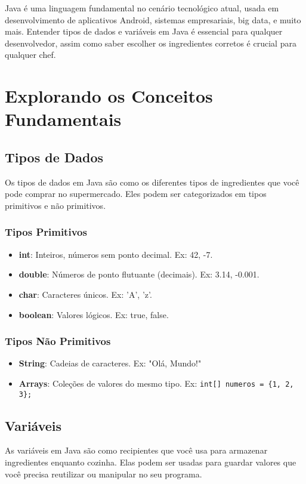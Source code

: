 \documentclass[a4paper,12pt]{book}
\begin{document}
Java é uma linguagem fundamental no cenário tecnológico atual, usada em desenvolvimento de aplicativos Android, sistemas empresariais, big data, e muito mais. Entender tipos de dados e variáveis em Java é essencial para qualquer desenvolvedor, assim como saber escolher os ingredientes corretos é crucial para qualquer chef.

\section{Explorando os Conceitos Fundamentais}

\subsection{Tipos de Dados}
Os tipos de dados em Java são como os diferentes tipos de ingredientes que você pode comprar no supermercado. Eles podem ser categorizados em tipos primitivos e não primitivos.

\subsubsection{Tipos Primitivos}
\begin{itemize}
    \item \textbf{int}: Inteiros, números sem ponto decimal. Ex: 42, -7.
    \item \textbf{double}: Números de ponto flutuante (decimais). Ex: 3.14, -0.001.
    \item \textbf{char}: Caracteres únicos. Ex: 'A', 'z'.
    \item \textbf{boolean}: Valores lógicos. Ex: true, false.
\end{itemize}

\subsubsection{Tipos Não Primitivos}
\begin{itemize}
    \item \textbf{String}: Cadeias de caracteres. Ex: "Olá, Mundo!"
    \item \textbf{Arrays}: Coleções de valores do mesmo tipo. Ex: \texttt{int[] numeros = \{1, 2, 3\};}
\end{itemize}

\subsection{Variáveis}
As variáveis em Java são como recipientes que você usa para armazenar ingredientes enquanto cozinha. Elas podem ser usadas para guardar valores que você precisa reutilizar ou manipular no seu programa.
\end{document}
